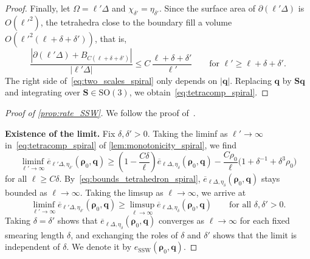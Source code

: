 \documentclass[final,reqno]{amsart}
\theoremstyle{remark}
\renewcommand{\le}{\leqslant}
\renewcommand{\ge}{\geqslant}
\newcommand{\ol}[1]{\overline{#1}}
\newcommand{\SO}{\mathrm{SO}}
\newcommand{\SSW}{\mathrm{SSW}}
\newcommand{\tetra}{\mathbb{\Delta}}
\begin{document}
\begin{proof}
Finally, let $\Omega=\ell'\tetra$ and $\chi_{\delta'}=\eta_{\delta'}$. Since the surface area of $\partial(\ell'\tetra)$ is $O(\ell'^2)$, the tetrahedra close to the boundary fill a volume $O(\ell'^2(\ell+\delta+\delta'))$, that is,
\[
 \frac{|\partial(\ell'\tetra)+B_{C(\ell+\delta+\delta')}|}{|\ell'\tetra|}\le C\,\frac{\ell+\delta+\delta'}{\ell'}\qquad\text{for $\ell'\ge\ell+\delta+\delta'$.}
\]
The right side of~\cref{eq:two_scales_spiral} only depends on $|\mathbf{q}|$. Replacing $\mathbf{q}$ by $\mathbf{S}\mathbf{q}$ and integrating over $\mathbf{S}\in\SO(3)$, we obtain~\cref{eq:tetracomp_spiral}.
\end{proof}

\begin{proof}[Proof of \cref{prop:rate_SSW}]
We follow the proof of~\cite[Theorem~5.10]{csirik2026non}.

\medskip

\noindent\textbf{Existence of the limit.} Fix $\delta,\delta'>0$. Taking the liminf as $\ell'\to\infty$ in~\cref{eq:tetracomp_spiral} of \cref{lem:monotonicity_spiral}, we find
\[
 \liminf_{\ell'\to\infty}\ol e_{\ell'\tetra,\eta_{\delta'}}(\bm{\rho}_0,\mathbf{q})
 \ge\left(1-\frac{C\delta}{\ell}\right)\ol e_{\ell\tetra,\eta_\delta}(\bm{\rho}_0,\mathbf{q})
 -\frac{C\rho_0}{\ell}\big(1+\delta^{-1}+\delta^3\rho_0\big)
\]
for all $\ell\ge C\delta$. By~\cref{eq:bounds_tetrahedron_spiral}, $\ol e_{\ell\tetra,\eta_\delta}(\bm{\rho}_0,\mathbf{q})$ stays bounded as $\ell\to\infty$. Taking the limsup as $\ell\to\infty$, we arrive at
\[
 \liminf_{\ell'\to\infty}\ol e_{\ell'\tetra,\eta_{\delta'}}(\bm{\rho}_0,\mathbf{q})\ge\limsup_{\ell\to\infty}\ol e_{\ell\tetra,\eta_\delta}(\bm{\rho}_0,\mathbf{q})
 \qquad\text{for all $\delta,\delta'>0$.}
\]
Taking $\delta=\delta'$ shows that $\ol e_{\ell\tetra,\eta_\delta}(\bm{\rho}_0,\mathbf{q})$ converges as $\ell\to\infty$ for each fixed smearing length $\delta$, and exchanging the roles of $\delta$ and $\delta'$ shows that the limit is independent of $\delta$. We denote it by $e_\SSW(\bm{\rho}_0,\mathbf{q})$.

\medskip


\end{proof}
\end{document}
